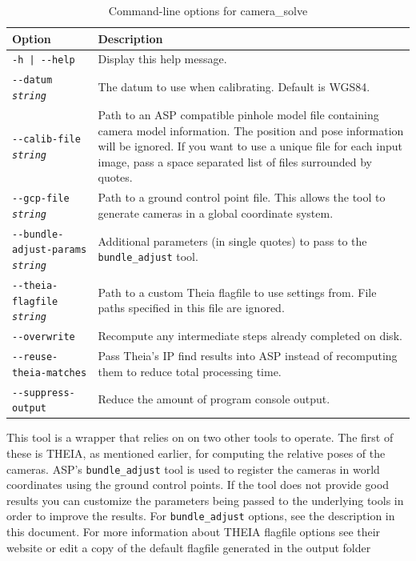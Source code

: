 \begin{longtable}{|l|p{7.5cm}|}
\caption{Command-line options for camera\_solve}
\label{tbl:camerasolve}
\endfirsthead
\endhead
\endfoot
\endlastfoot
\hline
Option & Description \\ \hline \hline
\texttt{-h | -\/-help } & Display this help message.\\ \hline
\texttt{-\/-datum  \textit{string}} & The datum to use when calibrating.  Default is WGS84.\\ \hline
\texttt{-\/-calib-file  \textit{string}} & Path to an ASP compatible pinhole model file containing 
camera model information. The position and pose information will be ignored. If you want 
to use a unique file for each input image, pass a space separated list of files surrounded by quotes.\\ \hline
\texttt{-\/-gcp-file  \textit{string}} & Path to a ground control point file.  This allows
the tool to generate cameras in a global coordinate system.\\ \hline
\texttt{-\/-bundle-adjust-params  \textit{string}} & Additional parameters (in single quotes)
to pass to the \texttt{bundle\_adjust} tool.\\ \hline
\texttt{-\/-theia-flagfile  \textit{string}} & Path to a custom Theia flagfile to use settings from.
File paths specified in this file are ignored.\\ \hline
\texttt{-\/-overwrite}  & Recompute any intermediate steps already completed on disk.\\ \hline
\texttt{-\/-reuse-theia-matches}  & Pass Theia's IP find results into ASP instead of recomputing 
them to reduce total processing time.\\ \hline
\texttt{-\/-suppress-output} & Reduce the amount of program console output.\\ \hline
\end{longtable}

This tool is a wrapper that relies on on two other tools to operate.
The first of these is THEIA, as mentioned earlier, for computing the
relative poses of the cameras.  ASP's \texttt{bundle\_adjust} tool is
used to register the cameras in world coordinates using the ground
control points.  If the tool does not provide good results you can
customize the parameters being passed to the underlying tools in order
to improve the results.  For \texttt{bundle\_adjust} options, see the
description in this document.  For more information about THEIA flagfile
options see their website or edit a copy of the default flagfile
generated in the output folder

